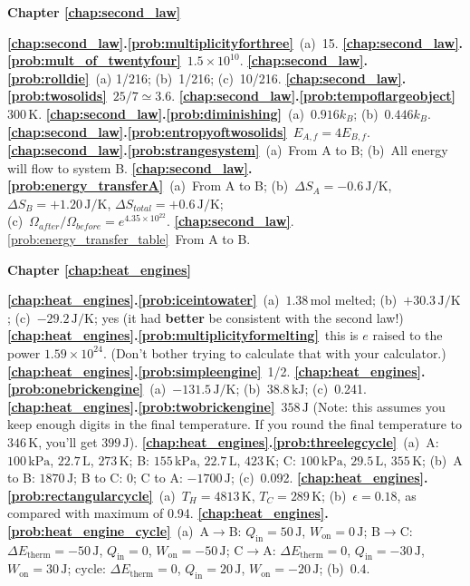  \textbf{Chapter \ref{chap:second_law}}


\textbf{\ref{chap:second_law}.\ref{prob:multiplicityforthree}}~(a)~15.
\textbf{\ref{chap:second_law}.\ref{prob:mult_of_twentyfour}}~$1.5 \times 10^{10}$.
\textbf{\ref{chap:second_law}.\ref{prob:rolldie}}~(a) 1/216; (b)~1/216; 
(c)~10/216.
\textbf{\ref{chap:second_law}.\ref{prob:twosolids}}~$25/7 \simeq 3.6$.
\textbf{\ref{chap:second_law}.\ref{prob:tempoflargeobject}}~$300\,\text{K}$.
\textbf{\ref{chap:second_law}.\ref{prob:diminishing}}~(a)~$0.916 k_B$; 
(b)~$0.446 k_B$.
\textbf{\ref{chap:second_law}.\ref{prob:entropyoftwosolids}}~$E_{A,f}=4E_{B,f}$.
\textbf{\ref{chap:second_law}.\ref{prob:strangesystem}}~(a)~From A to B; 
(b)~All energy will flow to system B.
\textbf{\ref{chap:second_law}.\ref{prob:energy_transferA}}~(a)~From A to B;
(b)~$\Delta S_A = -0.6\,\text{J/K}$, $\Delta S_B = +1.20\,\text{J/K}$, 
$\Delta S_{ total} = +0.6\,\text{J/K}$;\\
(c)~$\Omega_{ after}/\Omega_{ before} = e^{4.35\times 10^{22}}$.
\textbf{\ref{chap:second_law}}.\ref{prob:energy_transfer_table}~From A to B.
 


 \textbf{Chapter \ref{chap:heat_engines}}


\textbf{\ref{chap:heat_engines}.\ref{prob:iceintowater}}~(a)~$1.38\,\text{mol}$ 
melted; (b)~$+30.3\,\text{J/K}$; (c)~$-29.2\,\text{J/K}$; yes (it had 
\textbf{better} be consistent with the second law!)
\textbf{\ref{chap:heat_engines}.\ref{prob:multiplicityformelting}}~this is 
$e$  raised to the power $1.59\times 10^{24}$.  (Don't bother trying to 
calculate that with your calculator.)
\textbf{\ref{chap:heat_engines}.\ref{prob:simpleengine}}~1/2.
\textbf{\ref{chap:heat_engines}.\ref{prob:onebrickengine}}~(a)~$-131.5\,\text{J/K}$; 
(b)~$38.8\,\text{kJ}$; (c)~0.241.
\textbf{\ref{chap:heat_engines}.\ref{prob:twobrickengine}}~$358\,\text{J}$ 
(Note:  this assumes you keep enough digits in the final temperature.  
If you round the final temperature to $346\,\text{K}$, you'll get 
$399\,\text{J}$).
\textbf{\ref{chap:heat_engines}.\ref{prob:threelegcycle}}~(a)~A:  
$100\,\text{kPa}$, $22.7\,\text{L}$, $273\,\text{K}$; B: $155\,\text{kPa}$, 
$22.7\,\text{L}$, $423\,\text{K}$; C: $100\,\text{kPa}$, $29.5\,\text{L}$, 
$355\,\text{K}$; (b)~A to B:  $1870\,\text{J}$; B to C:  0; C to A:  
$-1700\,\text{J}$; (c)~0.092.
\textbf{\ref{chap:heat_engines}.\ref{prob:rectangularcycle}}~(a)~$T_H = 
4813\,\text{K}$, $T_C = 289\,\text{K}$; (b)~$\epsilon = 0.18$, as 
compared with maximum of 0.94. 
\textbf{\ref{chap:heat_engines}.\ref{prob:heat_engine_cycle}}~(a)~A$\rightarrow$B:
$Q_\text{in}=50\,\text{J}$, $W_\text{on} = 0\,\text{J}$; B$\rightarrow$C:
$\Delta E_\text{therm} = -50\,\text{J}$, $Q_\text{in} = 0$, $W_\text{on} = -50\,\text{J}$;
C$\rightarrow$A: $\Delta E_\text{therm}= 0$, $Q_\text{in} = -30\,\text{J}$,
$W_\text{on} = 30\,\text{J}$; cycle: $\Delta E_\text{therm} = 0$,  $Q_\text{in} = 20\,\text{J}$,
$W_\text{on} = -20\,\text{J}$; (b)~$0.4$.


